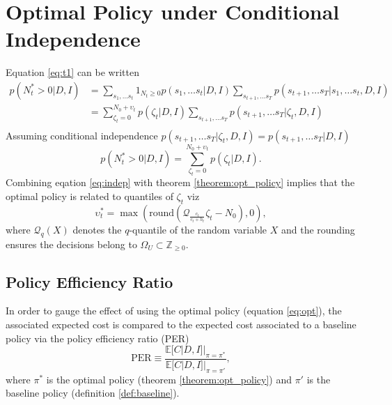 \documentclass[a4paper,12pt]{article}
\begin{document}
	
	\section{Optimal Policy under Conditional Independence}
	Equation \eqref{eq:t1} can be written
	\begin{equation}
		\begin{split}
			p(N_t^* > 0 | D, I) &= \sum_{s_1,\dots s_t}1_{N_{t}\geq 0}p(s_1,\dots s_t|D,I)\sum_{s_{t+1},\dots s_T}p(s_{t+1},\dots s_T|s_1,\dots s_t,D,I)\\
			& = \sum_{\zeta_t=0}^{N_0+\upsilon_t}p(\zeta_t|D,I)\sum_{s_{t+1},\dots s_T}p(s_{t+1},\dots s_T|\zeta_t,D,I)\\
		\end{split}
	\end{equation}
	Assuming conditional independence $p(s_{t+1},\dots s_T|\zeta_t,D,I)=p(s_{t+1},\dots s_T|D,I)$
	\begin{equation}
			p(N_t^* > 0 | D, I)  = \sum_{\zeta_t=0}^{N_0+\upsilon_t}p(\zeta_t|D,I).
			\label{eq:indep}
	\end{equation}
	Combining eqation \eqref{eq:indep} with theorem \ref{theorem:opt_policy} implies that the optimal policy is related to quantiles of $\zeta_t$ viz
	\begin{equation}
		\upsilon_t^* = \max(\text{round}(\mathcal{Q}_{\frac{c_t}{c_t+h_t}}\zeta_t-N_0),0),
		\label{eq:opt}
	\end{equation}
	where $\mathcal{Q}_q(X)$ denotes the $q$-quantile of the random variable $X$ and the rounding ensures the decisions belong to $\Omega_U\subset \mathbb{Z}_{\geq 0}$. 
	
	\subsection{Policy Efficiency Ratio}
	In order to gauge the effect of using the optimal policy (equation \eqref{eq:opt}), the associated expected cost is compared to the expected cost associated to a baseline policy via the policy efficiency ratio (PER)
	\begin{equation}
		\text{PER}\equiv \frac{\mathbb{E}[C|D,I]|_{\pi=\pi^*}}{\mathbb{E}[C|D,I]|_{\pi=\pi'}},
		\label{eq:per_def}
	\end{equation}
	where $\pi^*$ is the optimal policy (theorem \ref{theorem:opt_policy}) and $\pi'$ is the baseline policy (definition \ref{def:baseline}).
	
\end{document}
